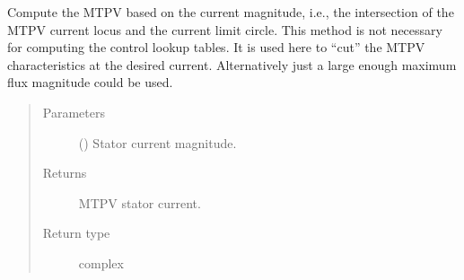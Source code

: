 \documentclass[letterpaper,10pt,english]{sphinxmanual}
\begin{document}
\begin{fulllineitems}
\begin{fulllineitems}
\begin{quote}
\begin{description}
\begin{itemize}
\end{itemize}


\end{description}\end{quote}

\end{fulllineitems}


\begin{fulllineitems}
\label{\detokenize{control.sm:control.sm.torque.TorqueCharacteristics.mtpv_current}}
\pysigstartsignatures
{}
\pysigstopsignatures
\sphinxAtStartPar
Compute the MTPV based on the current magnitude, i.e., the intersection
of the MTPV current locus and the current limit circle. This method is
not necessary for computing the control look\sphinxhyphen{}up tables. It is used here
to “cut” the MTPV characteristics at the desired current. Alternatively
just a large enough maximum flux magnitude could be used.
\begin{quote}\begin{description}
\item[{Parameters}] \leavevmode
\sphinxAtStartPar
{} () \textendash{} Stator current magnitude.

\item[{Returns}] \leavevmode
\sphinxAtStartPar
{} \textendash{} MTPV stator current.

\item[{Return type}] \leavevmode
\sphinxAtStartPar
complex

\end{description}\end{quote}

\end{fulllineitems}



\end{fulllineitems}
\end{document}
